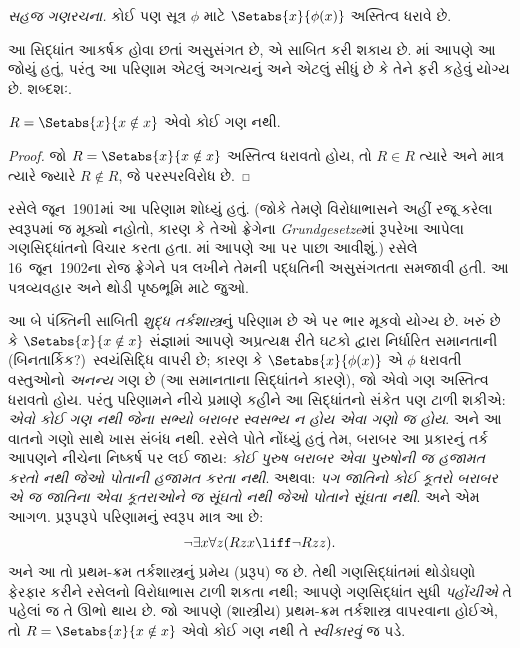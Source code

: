 \begin{defish}
  \emph{સહજ ગણરચના.} કોઈ પણ સૂત્ર $\phi$ માટે $\Setabs{x}{\phi(x)}$ અસ્તિત્વ ધરાવે છે.
\end{defish}

આ સિદ્ધાંત આકર્ષક હોવા છતાં અસુસંગત છે, એ સાબિત કરી શકાય છે.
માં આપણે આ જોયું હતું, પરંતુ આ પરિણામ
એટલું અગત્યનું અને એટલું સીધું છે કે તેને ફરી કહેવું યોગ્ય છે.
શબ્દશઃ.

\begin{thm}[રસેલનો વિરોધાભાસ]
$R = \Setabs{x}{x \notin x}$ એવો કોઈ ગણ નથી.
\end{thm}

\begin{proof}
જો $R = \Setabs{x}{x \notin x}$ અસ્તિત્વ ધરાવતો હોય, તો
$R \in R$ ત્યારે અને માત્ર ત્યારે જ્યારે $R \notin R$, જે પરસ્પરવિરોધ છે.
\end{proof}

રસેલે જૂન~1901માં આ પરિણામ શોધ્યું હતું. (જોકે તેમણે વિરોધાભાસને
અહીં રજૂ કરેલા સ્વરૂપમાં જ મૂક્યો નહોતો, કારણ કે તેઓ ફ્રેગેના
\emph{Grundgesetze}માં રૂપરેખા આપેલા ગણસિદ્ધાંતનો વિચાર કરતા હતા.
માં આપણે આ પર પાછા આવીશું.) રસેલે 16~જૂન~1902ના
રોજ ફ્રેગેને પત્ર લખીને તેમની પદ્ધતિની અસુસંગતતા સમજાવી હતી.
આ પત્રવ્યવહાર અને થોડી પૃષ્ઠભૂમિ માટે
\citet[pp.~124--8]{Heijenoort1967} જુઓ.

આ બે પંક્તિની સાબિતી \emph{શુદ્ધ તર્કશાસ્ત્ર}નું પરિણામ છે એ પર
ભાર મૂકવો યોગ્ય છે. ખરું છે કે $\Setabs{x}{x \notin x}$ સંજ્ઞામાં
આપણે અપ્રત્યક્ષ રીતે ઘટકો દ્વારા નિર્ધારિત સમાનતાની (બિનતાર્કિક?)\
સ્વયંસિદ્ધિ વાપરી છે; કારણ કે $\Setabs{x}{\phi(x)}$ એ $\phi$
ધરાવતી વસ્તુઓનો \emph{અનન્ય} ગણ છે (આ સમાનતાના સિદ્ધાંતને કારણે),
જો એવો ગણ અસ્તિત્વ ધરાવતો હોય. પરંતુ પરિણામને નીચે પ્રમાણે કહીને
આ સિદ્ધાંતનો સંકેત પણ ટાળી શકીએ:
\emph{એવો કોઈ ગણ નથી જેના સભ્યો બરાબર સ્વસભ્ય ન હોય એવા ગણો જ હોય}.
અને આ વાતનો ગણો સાથે ખાસ સંબંધ નથી. રસેલે પોતે નોંધ્યું હતું તેમ,
બરાબર આ પ્રકારનું તર્ક આપણને નીચેના નિષ્કર્ષ પર લઈ જાય:
\emph{કોઈ પુરુષ બરાબર એવા પુરુષોની જ હજામત કરતો નથી જેઓ પોતાની
હજામત કરતા નથી}. અથવા: \emph{પગ જાતિનો કોઈ કૂતરો બરાબર એ જ જાતિના
એવા કૂતરાઓને જ સૂંઘતો નથી જેઓ પોતાને સૂંઘતા નથી}. અને એમ આગળ.
પ્રરૂપરૂપે પરિણામનું સ્વરૂપ માત્ર આ છે:
\[
\lnot \exists x \forall z(Rzx \liff \lnot R zz).
\]
અને આ તો પ્રથમ-ક્રમ તર્કશાસ્ત્રનું પ્રમેય (પ્રરૂપ) જ છે. તેથી
ગણસિદ્ધાંતમાં થોડોઘણો ફેરફાર કરીને રસેલનો વિરોધાભાસ ટાળી શકતા નથી;
આપણે ગણસિદ્ધાંત સુધી \emph{પહોંચીએ} તે પહેલાં જ તે ઊભો થાય છે.
જો આપણે (શાસ્ત્રીય) પ્રથમ-ક્રમ તર્કશાસ્ત્ર વાપરવાના હોઈએ, તો
$R = \Setabs{x}{x\notin x}$ એવો કોઈ ગણ નથી તે \emph{સ્વીકારવું}
જ પડે.

